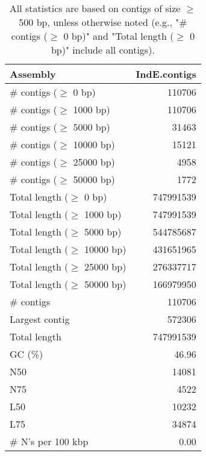 \documentclass[12pt,a4paper]{article}
\begin{document}
\begin{table}[ht]
\begin{center}
\caption{All statistics are based on contigs of size $\geq$ 500 bp, unless otherwise noted (e.g., "\# contigs ($\geq$ 0 bp)" and "Total length ($\geq$ 0 bp)" include all contigs).}
\begin{tabular}{|l*{1}{|r}|}
\hline
Assembly & IndE.contigs \\ \hline
\# contigs ($\geq$ 0 bp) & 110706 \\ \hline
\# contigs ($\geq$ 1000 bp) & 110706 \\ \hline
\# contigs ($\geq$ 5000 bp) & 31463 \\ \hline
\# contigs ($\geq$ 10000 bp) & 15121 \\ \hline
\# contigs ($\geq$ 25000 bp) & 4958 \\ \hline
\# contigs ($\geq$ 50000 bp) & 1772 \\ \hline
Total length ($\geq$ 0 bp) & 747991539 \\ \hline
Total length ($\geq$ 1000 bp) & 747991539 \\ \hline
Total length ($\geq$ 5000 bp) & 544785687 \\ \hline
Total length ($\geq$ 10000 bp) & 431651965 \\ \hline
Total length ($\geq$ 25000 bp) & 276337717 \\ \hline
Total length ($\geq$ 50000 bp) & 166979950 \\ \hline
\# contigs & 110706 \\ \hline
Largest contig & 572306 \\ \hline
Total length & 747991539 \\ \hline
GC (\%) & 46.96 \\ \hline
N50 & 14081 \\ \hline
N75 & 4522 \\ \hline
L50 & 10232 \\ \hline
L75 & 34874 \\ \hline
\# N's per 100 kbp & 0.00 \\ \hline
\end{tabular}
\end{center}
\end{table}
\end{document}
